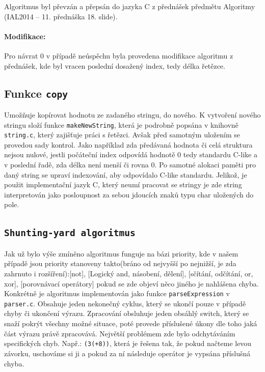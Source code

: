 \documentclass[12pt,a4paper,titlepage,final]{article}
\begin{document}
Algoritmus byl převzán a přepsán do jazyka C z přednášek předmětu Algoritmy (IAL2014
\cite{honzik2} -- 11. přednáška 18. slide).
 
\paragraph{Modifikace:} Pro návrat 0 v případě neúspěchu byla provedena modifikace
algoritmu z přednášek, kde byl vracen poslední dosažený index, tedy délka řetězce.

\subsection{Funkce \texttt{copy}}
Umožňuje kopírovat hodnotu ze zadaného stringu, do nového. K vytvoření nového stringu složí funkce \verb|makeNewString|, která je podrobně popsána v knihovně \verb|string.c|, který zajišťuje práci s řetězci. Avšak před samotným uložením se provedou sady kontrol. Jako například zda předávaná hodnota či celá struktura nejsou nulové, jestli počáteční index odpovídá hodnotě 0 tedy standardu C-like a v poslední řadě, zda délka není menší či rovna 0. Po samotné alokaci paměti pro daný string se upraví indexování, aby odpovídalo C-like standardu. Jelikož, je použit implementační jazyk C, který neumí pracovat se stringy je zde string interpretován jako posloupnost za sebou jdoucích znaků typu char uložených do pole.

\subsection{\texttt{Shunting-yard algoritmus}}
Jak už bylo výše zmíněno algoritmus funguje na bázi priority, kde v našem případě jsou priority stanoveny takto(bráno od nejvyšší po nejnižší, je zda zahrnuto i rozšíření):[not], [Logický and, násobení, dělení], [sčítání, odčítání, or, xor], [porovnávací operátory] pokud se zde objeví něco jiného je nahlášena chyba. Konkrétně je algoritmus implementován jako funkce \verb|parseExpression| v \verb|parser.c|. Obsahuje jeden nekonečný cyklus, který se ukončí pouze v případě chyby či ukončení výrazu. Zpracování obsluhuje jeden obsáhlý switch, který se snaží pokrýt všechny možné situace, poté provede příslušené úkony dle toho jaká část výrazu právě zpracovává. Největší problémem zde bylo odchytáváním specifických chyb. Např.: \verb|(3(+8))|, která je řešena tak, že pokud načteme levou závorku, uschováme si ji a pokud za ní následuje operátor je vypsána příslušná chyba.
\end{document}
